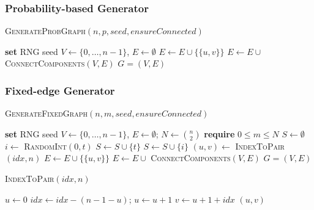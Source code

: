\documentclass[12pt]{article}
\begin{document}
\subsubsection{Probability-based Generator}
\begin{algorithm}[H]
\caption{\textsc{GenerateProbGraph}$(n,p,seed,ensureConnected)$}
\begin{algorithmic}[1]
\State \textbf{set} RNG seed
\State \(V \gets \{0,\dots,n-1\}\), \(E \gets \emptyset\)
    \State \(E \gets E \cup \{\{u,v\}\}\)
  \EndIf
\EndFor
{}
  \State \(E \gets E \cup\) \textsc{ConnectComponents}$(V,E)$
\EndIf
\State \Return \(G=(V,E)\)
\end{algorithmic}
\end{algorithm}

\subsubsection{Fixed-edge Generator}
\begin{algorithm}[H]
\caption{\textsc{GenerateFixedGraph}$(n,m,seed,ensureConnected)$}
\begin{algorithmic}[1]
\State \textbf{set} RNG seed
\State \(V \gets \{0,\dots,n-1\}\), \(E \gets \emptyset\); \(N \gets \binom{n}{2}\)
\State \textbf{require} \(0 \le m \le N\)
\State \(S \gets \emptyset\) 
 
  \State $i \gets$ \textsc{RandomInt}$(0,t)$
   \State $S \gets S \cup \{t\}$ \Else \State $S \gets S \cup \{i\}$ \EndIf
\EndFor
{}
  \State $(u,v) \gets$ \textsc{IndexToPair}$(idx,n)$ 
  \State $E \gets E \cup \{\{u,v\}\}$
\EndFor
{}
  \State $E \gets E \cup$ \textsc{ConnectComponents}$(V,E)$
\EndIf
\State \Return $G=(V,E)$
\end{algorithmic}
\end{algorithm}

\begin{algorithm}[H]
\caption{\textsc{IndexToPair}$(idx,n)$}
\begin{algorithmic}[1]
\State $u \gets 0$
  \State $idx \gets idx - (n-1-u)$; $u \gets u+1$
\EndWhile
\State $v \gets u + 1 + idx$ 
\State \Return $(u,v)$
\end{algorithmic}
\end{algorithm}
\end{document}
